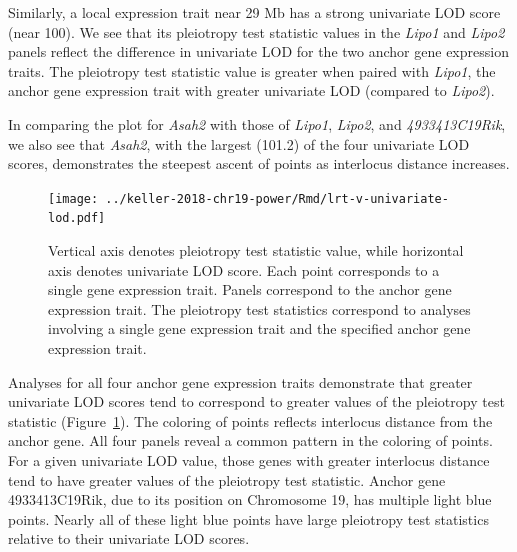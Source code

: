\documentclass[oneside]{book}\usepackage[]{graphicx}\usepackage[]{color}
\begin{document}
Similarly, a local expression trait near 29 Mb has a strong univariate LOD score (near 100). 
We see that its pleiotropy test statistic values in the \emph{Lipo1} and \emph{Lipo2} panels reflect the difference in univariate LOD for the two anchor gene expression traits. 
The pleiotropy test statistic value is greater when 
paired with \emph{Lipo1}, the anchor gene expression trait with greater univariate LOD (compared to \emph{Lipo2}). 

In comparing the plot for \emph{Asah2} with those of \emph{Lipo1}, \emph{Lipo2}, and \emph{4933413C19Rik}, we also see that \emph{Asah2}, with the largest (101.2) of the four univariate LOD scores, demonstrates the steepest ascent of points as interlocus distance increases. 






\begin{figure}
    \centering
    \texttt{[image: ../keller-2018-chr19-power/Rmd/lrt-v-univariate-lod.pdf]}
    \caption[Pleiotropy LRT vs. univariate LOD score plots reveal that greater univariate LOD scores (and greater interlocus distance) tend to correspond to greater pleiotropy LRT values.]{Vertical axis denotes pleiotropy test statistic value, while horizontal axis denotes univariate LOD score. Each point corresponds to a single gene expression trait. Panels correspond to the anchor gene expression trait. The pleiotropy test statistics correspond to analyses involving a single gene expression trait and the specified anchor gene expression trait.}
    \label{fig:lod}
\end{figure}

Analyses for all four anchor gene expression traits demonstrate that greater univariate LOD
scores tend to correspond to greater values of the pleiotropy test statistic (Figure~\ref{fig:lod}). 
The coloring of points reflects interlocus distance from the anchor gene. 
All four panels reveal a common pattern in the coloring of points.
For a given univariate LOD value, those genes with greater interlocus distance 
tend to have greater values of the pleiotropy test statistic. 
Anchor gene 4933413C19Rik, due to its position on Chromosome 19, has multiple light blue points. 
Nearly all of these light blue points have large pleiotropy test
statistics relative to their univariate LOD scores.
\end{document}

